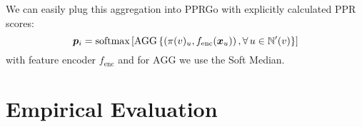 \documentclass[sigconf, review]{acmart}
\newcommand{\neighbors}{\sN}
\begin{document}

We can easily plug this aggregation into PPRGo with explicitly calculated PPR scores:
\begin{equation}\label{eq:robustpprgo}
  \vp_{i} = \text{softmax} \left[ \text{AGG} \left \{ \left( \pi(v)_{u}, f_{\text{enc}}(\vx_u) \right), \forall \, u \in \neighbors'(v) \right \} \right]
\end{equation}
with feature encoder \(f_{\text{enc}}\) and for \(\text{AGG}\) we use the Soft Median.

\section{Empirical Evaluation}\label{sec:empirical}

\end{document}
